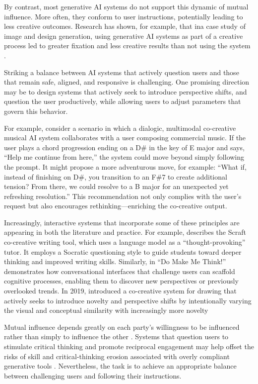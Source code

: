 By contrast, most generative AI systems do not support this dynamic of mutual influence. More often, they conform to user instructions, potentially leading to less creative outcomes. Research has shown, for example, that ina  case study of image and design generation, using generative AI systems as part of a creative process led to greater fixation and less creative results than not using the system \cite{Wadinambiarachchi2024-jn}. 

Striking a balance between AI systems that actively question users and those that remain safe, aligned, and responsive is challenging. One promising direction may be to design systems that actively seek to introduce perspective shifts, and question the user productively, while allowing users to adjust parameters that govern this behavior. 

For example, consider a scenario in which a dialogic, multimodal co-creative musical AI system collaborates with a user composing commercial music. If the user plays a chord progression ending on a D\# in the key of E major and says, “Help me continue from here,” the system could move beyond simply following the prompt. It might propose a more adventurous move, for example: “What if, instead of finishing on D\#, you transition to an F\#7 to create additional tension? From there, we could resolve to a B major for an unexpected yet refreshing resolution.” This recommendation not only complies with the user’s request but also encourages rethinking—enriching the co-creative output.

Increasingly, interactive systems that incorporate some of these principles are appearing in both the literature and practice. For example, \cite{Kim2023-wt} describes the Scraft co-creative writing tool, which uses a language model as a “thought-provoking” tutor. It employs a Socratic questioning style to guide students toward deeper thinking and improved writing skills. Similarly, in “Do Make Me Think!” \cite{Reicherts2020-up} demonstrates how conversational interfaces that challenge users can scaffold cognitive processes, enabling them to discover new perspectives or previously overlooked trends. In 2019, \cite{Karimi2019-io} introduced a co-creative system for drawing that actively seeks to introduce novelty and perspective shifts by intentionally varying the visual and conceptual similarity with increasingly more novelty 

Mutual influence depends greatly on each party’s willingness to be influenced rather than simply to influence the other \cite{Bohm1996-fo}. Systems that question users to stimulate critical thinking and promote reciprocal engagement may help offset the risks of skill and critical-thinking erosion associated with overly compliant generative tools \cite{Abbas2024-sf, Essel2024-qc}. Nevertheless, the task is to achieve an appropriate balance between challenging users and following their instructions.

